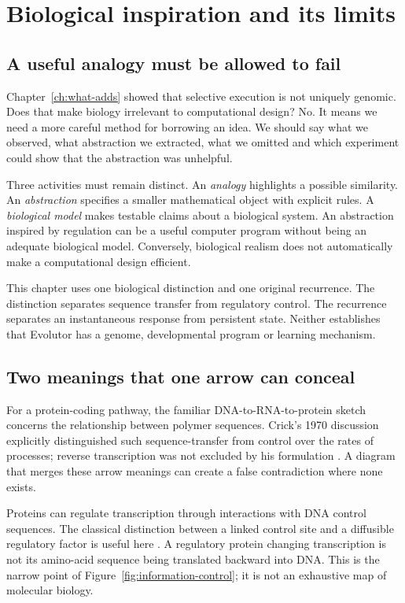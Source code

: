 \chapter{Biological inspiration and its limits}
\label{ch:biology-limits}

\section*{A useful analogy must be allowed to fail}
Chapter~\ref{ch:what-adds} showed that selective execution is not uniquely
genomic. Does that make biology irrelevant to computational design? No. It
means we need a more careful method for borrowing an idea. We should say what
we observed, what abstraction we extracted, what we omitted and which
experiment could show that the abstraction was unhelpful.

Three activities must remain distinct. An \emph{analogy} highlights a possible
similarity. An \emph{abstraction} specifies a smaller mathematical object with
explicit rules. A \emph{biological model} makes testable claims about a biological
system. An abstraction inspired by regulation can be a useful computer program
without being an adequate biological model. Conversely, biological realism
does not automatically make a computational design efficient.

This chapter uses one biological distinction and one original recurrence.
The distinction separates sequence transfer from regulatory control. The
recurrence separates an instantaneous response from persistent state. Neither
establishes that Evolutor has a genome, developmental program or learning
mechanism.

\section{Two meanings that one arrow can conceal}
For a protein-coding pathway, the familiar DNA-to-RNA-to-protein sketch concerns
the relationship between polymer sequences. Crick's 1970 discussion explicitly
distinguished such \gls{sequence-transfer} from control over the rates of processes;
reverse transcription was not excluded by his formulation
\citep{crick1970}. A diagram that merges these arrow meanings can create a
false contradiction where none exists.

Proteins can regulate transcription through interactions with DNA control
sequences. The classical distinction between a linked control site and a
diffusible regulatory factor is useful here \citep{cooper2000transcription}.
A regulatory protein changing transcription is not its amino-acid sequence
being translated backward into DNA. This is the narrow point of
Figure~\ref{fig:information-control}; it is not an exhaustive map of molecular
biology.

